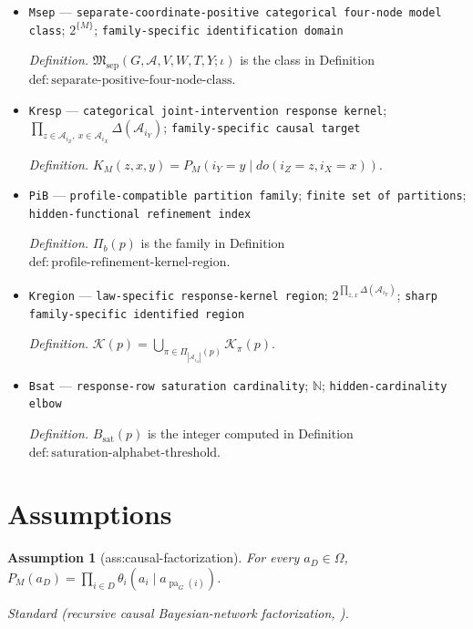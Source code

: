 \documentclass{article}
\newtheorem{assumption}{Assumption}
\begin{document}
\begin{itemize}
  \item \texttt{Msep} --- \texttt{separate-\allowbreak{}coordinate-\allowbreak{}positive categorical four-\allowbreak{}node model class}; \(2^{\{M\}}\); \texttt{family-\allowbreak{}specific identification domain}
  \par\smallskip\noindent\emph{Definition.} \(\mathfrak M_{\mathrm{sep}}(G,\mathcal A,V,W,T,Y;\iota)\) is the class in Definition \(\mathrm{def:separate\text{-}positive\text{-}four\text{-}node\text{-}class}\).
  \item \texttt{Kresp} --- \texttt{categorical joint-\allowbreak{}intervention response kernel}; \(\prod_{z\in\mathcal A_{i_Z},\ x\in\mathcal A_{i_X}}\Delta(\mathcal A_{i_Y})\); \texttt{family-\allowbreak{}specific causal target}
  \par\smallskip\noindent\emph{Definition.} \(K_M(z,x,y)=P_M(i_Y=y\mid do(i_Z=z,i_X=x))\).
  \item \texttt{PiB} --- \texttt{profile-\allowbreak{}compatible partition family}; \texttt{finite set of partitions}; \texttt{hidden-\allowbreak{}functional refinement index}
  \par\smallskip\noindent\emph{Definition.} \(\Pi_b(p)\) is the family in Definition \(\mathrm{def:profile\text{-}refinement\text{-}kernel\text{-}region}\).
  \item \texttt{Kregion} --- \texttt{law-\allowbreak{}specific response-\allowbreak{}kernel region}; \(2^{\prod_{z,x}\Delta(\mathcal A_{i_Y})}\); \texttt{sharp family-\allowbreak{}specific identified region}
  \par\smallskip\noindent\emph{Definition.} \(\mathcal K(p)=\bigcup_{\pi\in\Pi_{|\mathcal A_{i_A}|}(p)}\mathcal K_\pi(p)\).
  \item \texttt{Bsat} --- \texttt{response-\allowbreak{}row saturation cardinality}; \(\mathbb N\); \texttt{hidden-\allowbreak{}cardinality elbow}
  \par\smallskip\noindent\emph{Definition.} \(B_{\mathrm{sat}}(p)\) is the integer computed in Definition \(\mathrm{def:saturation\text{-}alphabet\text{-}threshold}\).
\end{itemize}

\section{Assumptions}

\begin{assumption}[ass:causal-factorization]\label{ass:causal-factorization}
For every \(a_D\in\Omega\), \(P_M(a_D)=\prod_{i\in D}\theta_i(a_i\mid a_{\operatorname{pa}_G(i)})\).
\par\smallskip\noindent\emph{Standard} (recursive causal Bayesian-network factorization, \cite{Pearl2009}).
\end{assumption}
\end{document}
